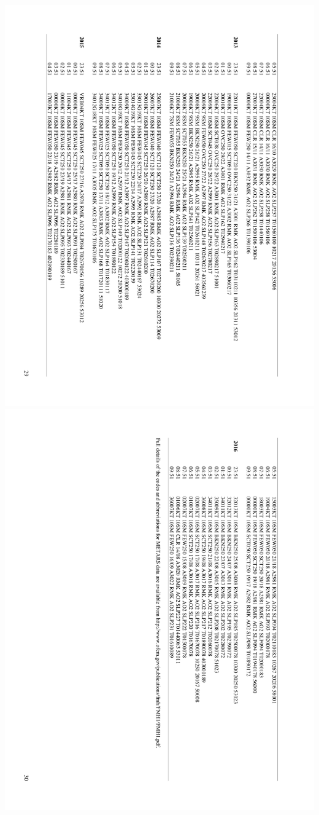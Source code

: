 \documentclass[a4paper, twoside]{templates/ociamthesis}
\begin{document}
\includegraphics[width=1\linewidth]{pdf_chapters/lights/lights_supp_crop_Part33}
\includegraphics[width=1\linewidth]{pdf_chapters/lights/lights_supp_crop_Part34}
\end{document}
